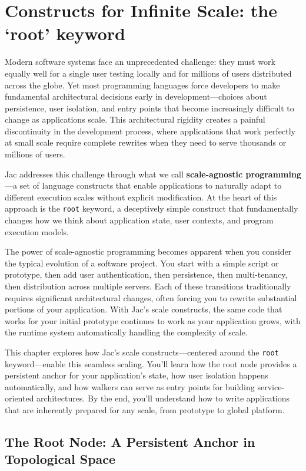 \chapter{Constructs for Infinite Scale: the `root' keyword}

Modern software systems face an unprecedented challenge: they must work equally well for a single user testing locally and for millions of users distributed across the globe. Yet most programming languages force developers to make fundamental architectural decisions early in development—choices about persistence, user isolation, and entry points that become increasingly difficult to change as applications scale. This architectural rigidity creates a painful discontinuity in the development process, where applications that work perfectly at small scale require complete rewrites when they need to serve thousands or millions of users.

Jac addresses this challenge through what we call \textbf{scale-agnostic programming}—a set of language constructs that enable applications to naturally adapt to different execution scales without explicit modification. At the heart of this approach is the \texttt{root} keyword, a deceptively simple construct that fundamentally changes how we think about application state, user contexts, and program execution models.

The power of scale-agnostic programming becomes apparent when you consider the typical evolution of a software project. You start with a simple script or prototype, then add user authentication, then persistence, then multi-tenancy, then distribution across multiple servers. Each of these transitions traditionally requires significant architectural changes, often forcing you to rewrite substantial portions of your application. With Jac's scale constructs, the same code that works for your initial prototype continues to work as your application grows, with the runtime system automatically handling the complexity of scale.

This chapter explores how Jac's scale constructs—centered around the \texttt{root} keyword—enable this seamless scaling. You'll learn how the root node provides a persistent anchor for your application's state, how user isolation happens automatically, and how walkers can serve as entry points for building service-oriented architectures. By the end, you'll understand how to write applications that are inherently prepared for any scale, from prototype to global platform.

\section{The Root Node: A Persistent Anchor in Topological Space}

